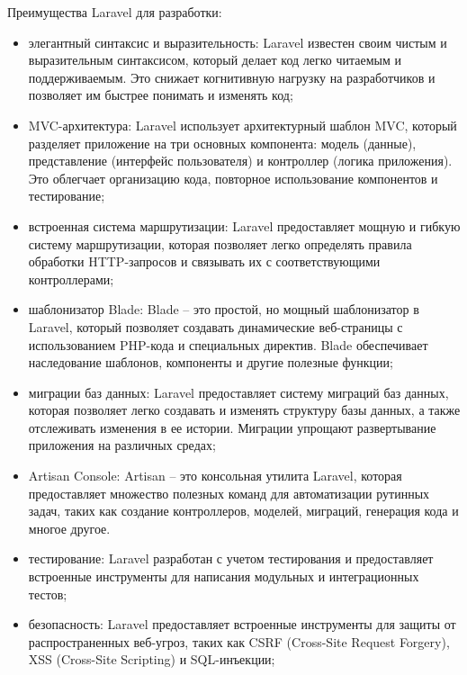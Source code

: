Преимущества Laravel для разработки:
\begin{itemize}
\item	элегантный синтаксис и выразительность: Laravel известен своим чистым и выразительным синтаксисом, который делает код легко читаемым и поддерживаемым. Это снижает когнитивную нагрузку на разработчиков и позволяет им быстрее понимать и изменять код;

\item	MVC-архитектура: Laravel использует архитектурный шаблон MVC, который разделяет приложение на три основных компонента: модель (данные), представление (интерфейс пользователя) и контроллер (логика приложения). Это облегчает организацию кода, повторное использование компонентов и тестирование;

\item	встроенная система маршрутизации: Laravel предоставляет мощную и гибкую систему маршрутизации, которая позволяет легко определять правила обработки HTTP-запросов и связывать их с соответствующими контроллерами;

\item	шаблонизатор Blade: Blade – это простой, но мощный шаблонизатор в Laravel, который позволяет создавать динамические веб-страницы с использованием PHP-кода и специальных директив. Blade обеспечивает наследование шаблонов, компоненты и другие полезные функции;

\item	миграции баз данных: Laravel предоставляет систему миграций баз данных, которая позволяет легко создавать и изменять структуру базы данных, а также отслеживать изменения в ее истории. Миграции упрощают развертывание приложения на различных средах;

\item	Artisan Console: Artisan – это консольная утилита Laravel, которая предоставляет множество полезных команд для автоматизации рутинных задач, таких как создание контроллеров, моделей, миграций, генерация кода и многое другое.

\item	тестирование: Laravel разработан с учетом тестирования и предоставляет встроенные инструменты для написания модульных и интеграционных тестов;

\item	безопасность: Laravel предоставляет встроенные инструменты для защиты от распространенных веб-угроз, таких как CSRF (Cross-Site Request Forgery), XSS (Cross-Site Scripting) и SQL-инъекции;


\end{itemize}

